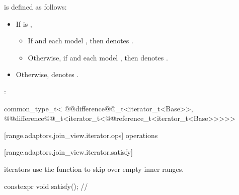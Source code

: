 {\color{newclr}
\pnum
{} is defined as follows:
\begin{itemize}
\item If  is ,

  \begin{itemize}
  \item If  and  each model
  , then  denotes
  .

  \item Otherwise, if  and 
  each model , then  denotes
  .
  \end{itemize}

\item Otherwise,  denotes .
\end{itemize}
} %

\pnum
{} 
:
\begin{codeblock}
common_type_t<
  @@difference@@_t<iterator_t<Base>>,
  @@difference@@_t<iterator_t<@@reference_t<iterator_t<Base>>>>>
\end{codeblock}

[range.adaptors.join_view.iterator.ops]{ operations}

[range.adaptors.join_view.iterator.satisfy]{}
{\color{newclr}
\pnum
{} iterators use the  function to skip over empty
inner ranges.

\begin{itemdecl}
constexpr void satisfy(); // \expos
\end{itemdecl}
} %

